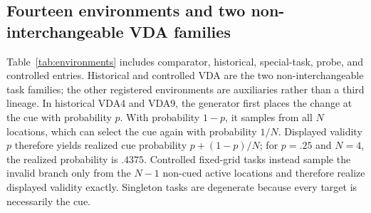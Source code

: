 \documentclass[11pt,a4paper]{article}
\begin{document}
\subsection{Fourteen environments and two non-interchangeable VDA families}
Table~\ref{tab:environments} includes comparator, historical, special-task, probe, and controlled entries. Historical and controlled VDA are the two non-interchangeable task families; the other registered environments are auxiliaries rather than a third lineage. In historical VDA4 and VDA9, the generator first places the change at the cue with probability $p$. With probability $1-p$, it samples from all $N$ locations, which can select the cue again with probability $1/N$. Displayed validity $p$ therefore yields realized cue probability $p+(1-p)/N$; for $p=.25$ and $N=4$, the realized probability is $.4375$. Controlled fixed-grid tasks instead sample the invalid branch only from the $N-1$ non-cued active locations and therefore realize displayed validity exactly. Singleton tasks are degenerate because every target is necessarily the cue.
\end{document}
